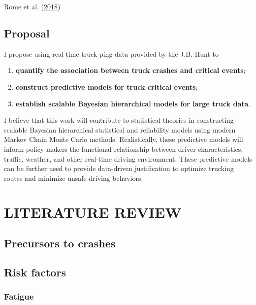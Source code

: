 \documentclass[12pt]{book}
\numberwithin{equation}{chapter}
\providecommand{\tightlist}{%
  \setlength{\itemsep}{0pt}\setlength{\parskip}{0pt}}
\begin{document}
Rome et al. (\protect\hyperlink{ref-de2018near}{2018})

\hypertarget{proposal}{%
\section{Proposal}\label{proposal}}

I propose using real-time truck ping data provided by the J.B. Hunt to

\begin{enumerate}
\def\labelenumi{\arabic{enumi})}
\tightlist
\item
  \textbf{quantify the association between truck crashes and critical events};
\item
  \textbf{construct predictive models for truck critical events};
\item
  \textbf{establish scalable Bayesian hierarchical models for large truck data}.
\end{enumerate}

I believe that this work will contribute to statistical theories in constructing scalable Bayesian hierarchical statistical and reliability models using modern Markov Chain Monte Carlo methods. Realistically, these predictive models will inform policy-makers the functional relationship between driver characteristics, traffic, weather, and other real-time driving environment. These predictive models can be further used to provide data-driven justification to optimize trucking routes and minimize unsafe driving behaviors.

\hypertarget{literature-review}{%
\chapter{LITERATURE REVIEW}\label{literature-review}}

\hypertarget{precursors-to-crashes}{%
\section{Precursors to crashes}\label{precursors-to-crashes}}

\hypertarget{risk-factors}{%
\section{Risk factors}\label{risk-factors}}

\hypertarget{fatigue}{%
\subsection{Fatigue}\label{fatigue}}
\end{document}
